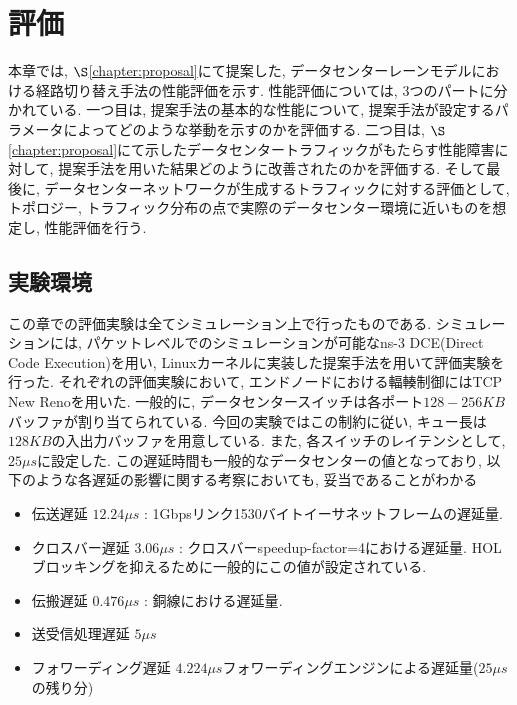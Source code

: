 \chapter{評価}
\label{chapter:evaluation}

本章では, $\S$\ref{chapter:proposal}にて提案した, データセンターレーンモデルにおける経路切り替え手法の性能評価を示す. 
性能評価については, 3つのパートに分かれている. 
一つ目は, 提案手法の基本的な性能について, 提案手法が設定するパラメータによってどのような挙動を示すのかを評価する. 
二つ目は, $\S$\ref{chapter:proposal}にて示したデータセンタートラフィックがもたらす性能障害に対して,
提案手法を用いた結果どのように改善されたのかを評価する. 
そして最後に, データセンターネットワークが生成するトラフィックに対する評価として, トポロジー,
トラフィック分布の点で実際のデータセンター環境に近いものを想定し, 性能評価を行う. 

\section{実験環境}
この章での評価実験は全てシミュレーション上で行ったものである.
シミュレーションには, パケットレベルでのシミュレーションが可能なns-3 DCE(Direct Code
Execution)\cite{ns3}を用い, Linuxカーネルに実装した提案手法を用いて評価実験を行った.
それぞれの評価実験において, エンドノードにおける輻輳制御にはTCP New Renoを用いた. 
一般的に, データセンタースイッチは各ポート$128-256KB$バッファが割り当てられている\cite{dctcp}. 
今回の実験ではこの制約に従い, キュー長は$128KB$の入出力バッファを用意している. 
また, 各スイッチのレイテンシとして, $25 \mu s$に設定した. 
この遅延時間も一般的なデータセンターの値となっており\cite{dctcp}, 以下のような各遅延の影響に関する考察においても,
妥当であることがわかる\cite{detail}

\begin{itemize}
\item 伝送遅延 $12.24\mu s$ : 1Gbpsリンク1530バイトイーサネットフレームの遅延量. 
\item クロスバー遅延 $3.06\mu s$ : クロスバーspeedup-factor=4における遅延量.
HOLブロッキングを抑えるために一般的にこの値が設定されている\cite{crossbar}. 
\item 伝搬遅延 $0.476\mu s$ : 銅線における遅延量\cite{delay}.
\item 送受信処理遅延 $5\mu s$\cite{delay}
\item フォワーディング遅延 $4.224\mu s$フォワーディングエンジンによる遅延量($25\mu s$の残り分)
\end{itemize} 

